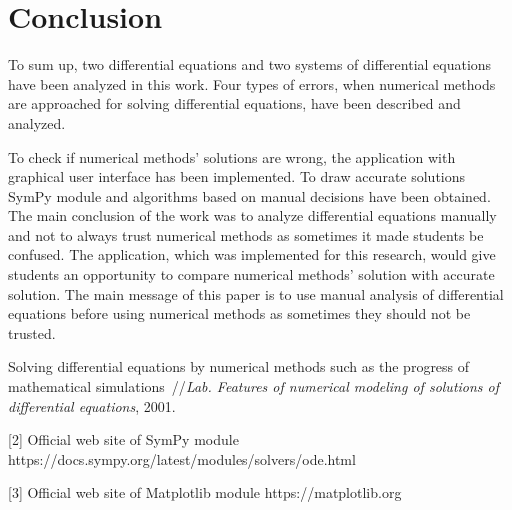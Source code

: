 \documentclass{article}
\begin{document}
\section{Conclusion}
To sum up, two differential equations and two systems of differential equations have been analyzed in this work. Four types of errors, when numerical methods are approached for solving differential equations, have been described and analyzed. 
\par To check if numerical methods' solutions are wrong, the application with graphical user interface has been implemented. To draw accurate solutions SymPy module and algorithms based on manual decisions have been obtained. The main conclusion of the work was to analyze differential equations manually and not to always trust numerical methods as sometimes it made students be confused. The application, which was implemented for this research, would give students an opportunity to compare numerical methods' solution with accurate solution. The main message of this paper is to use manual analysis of differential equations before using numerical methods as sometimes they should not be trusted. 








\newpage
{}
\renewcommand\refname{References}
\begin{thebibliography}{99}
 Solving differential equations by numerical methods such as the progress of mathematical simulations~//{\it Lab. Features of numerical modeling of solutions of differential equations}, 2001. 

\end{thebibliography}

[2] Official web site of SymPy module https://docs.sympy.org/latest/modules/solvers/ode.html
\vspace{1mm}

[3] Official web site of Matplotlib module https://matplotlib.org
\end{document}
